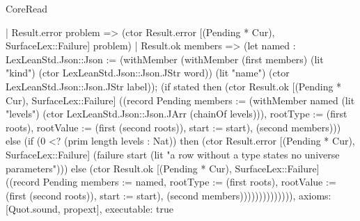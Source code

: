\begin{lexlean}{CoreRead}
\begin{semanticmodule}
{          | Result.error problem => (ctor Result.error [(Pending * Cur), SurfaceLex::Failure] problem)
          | Result.ok members => (let named : LexLeanStd.Json::Json := (withMember (withMember (first members) (lit "kind") (ctor LexLeanStd.Json::Json.JStr word)) (lit "name") (ctor LexLeanStd.Json::Json.JStr label)); (if stated then (ctor Result.ok [(Pending * Cur), SurfaceLex::Failure] ((record Pending {members := (withMember named (lit "levels") (ctor LexLeanStd.Json::Json.JArr (chainOf levels))), rootType := (first roots), rootValue := (first (second roots)), start := start}), (second members))) else (if (0 <? (prim length levels : Nat)) then (ctor Result.error [(Pending * Cur), SurfaceLex::Failure] (failure start (lit "a row without a type states no universe parameters"))) else (ctor Result.ok [(Pending * Cur), SurfaceLex::Failure] ((record Pending {members := named, rootType := (first roots), rootValue := (first (second roots)), start := start}), (second members)))))))))))))),
  axioms: [Quot.sound, propext],
  executable: true
}


\end{semanticmodule}
\end{lexlean}
